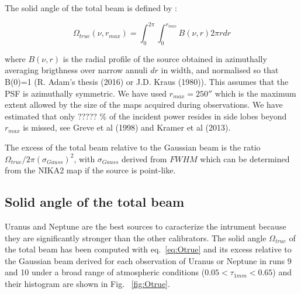 The solid angle of the total beam is defined by :

\begin{equation}
 \Omega_{true} (\nu,r_{max}) = \int_0^{2\pi} \int_0^{r_{max}} B(\nu, r) 2 \pi r dr
\label{eq:Otrue}
\end{equation}

\noindent where $B(\nu,r)$ is the radial profile of the source obtained in azimuthally averaging brigthness over narrow annuli
$dr$ in width, and normalised so that B(0)=1 (R. Adam's thesis (2016) or J.D. Kraus (1980)).
This assumes that the PSF is azimuthally symmetric. 
We have used $r_{max}=250''$ which is the maximum extent allowed by the size of the maps acquired during observations.
We have estimated that only ????? \%  of the incident power resides in side lobes beyond $r_{max}$ is missed,
see Greve et al (1998) and Kramer et al (2013).

The excess of the total beam relative to the Gaussian beam is the ratio
$\Omega_{true} / 2 \pi (\sigma_{Gauss})^2$, with  $\sigma_{Gauss}$ derived from $FWHM$ which can be determined
from the NIKA2 map if the source is point-like.


\subsection{Solid angle of the total beam}
\label{S:solang}

Uranus and Neptune are the best sources to caracterize the intrument because
they are significantly stronger than the other calibrators.                                                               
The solid angle $\Omega_{true}$ of the total beam has been computed with  eq.~\ref{eq:Otrue}
and its excess relative to the Gaussian beam derived
for each  observation of Uranus or Neptune in  runs 9 and 10 under  a broad range of atmospheric conditions
($0.05 < \tau_{1mm} < 0.65$)  and their histogram are shown in Fig. ~\ref{fig:Otrue}.

